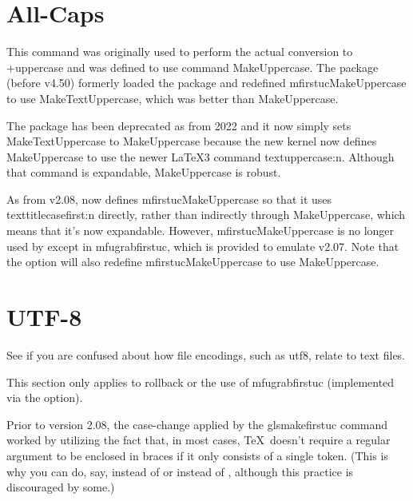 \documentclass[titlepage=false,oneside,
 fontsize=12pt,captions=tableheading]{scrbook}
\begin{document}
\section{All-Caps}
\label{sec:allcaps}

This command was originally used to perform the actual conversion to
\idx+{uppercase} and was defined to use command \gls{MakeUppercase}.
The  package (before v4.50) formerly loaded the
 package and redefined \gls{mfirstucMakeUppercase} to
use \gls{MakeTextUppercase}, which was better than
\gls{MakeUppercase}.

The  package has been deprecated as from 2022 and
it now simply sets \gls{MakeTextUppercase} to \gls{MakeUppercase}
because the new kernel now defines \gls{MakeUppercase} to use the
newer \LaTeX3 command \gls{textuppercase:n}. Although that command
is expandable, \gls{MakeUppercase} is robust.

As from v2.08,  now defines \gls{mfirstucMakeUppercase}
so that it uses \gls{texttitlecasefirst:n} directly, rather than
indirectly through \gls{MakeUppercase}, which means that it's now
expandable. However, \gls{mfirstucMakeUppercase} is no longer used
by  except in \gls{mfugrabfirstuc}, which is provided
to emulate v2.07. Note that the  option will also
redefine \gls{mfirstucMakeUppercase} to use \gls{MakeUppercase}.

\section{UTF-8}
\label{sec:utf8}

\begin{information}
See  if you are confused about how
file encodings, such as \gls{utf8}, relate to text files.
\end{information}

This section only applies to rollback or the use of \gls{mfugrabfirstuc}
(implemented via the  option).

Prior to version 2.08, the case-change applied by the
\gls{glsmakefirstuc} command worked by utilizing the fact that, in
most cases, \TeX\ doesn't require a regular argument to be enclosed
in braces if it only consists of a single token. (This is why you
can do, say,  instead of
 or 
instead of , although this
practice is discouraged by some.)
\end{document}
